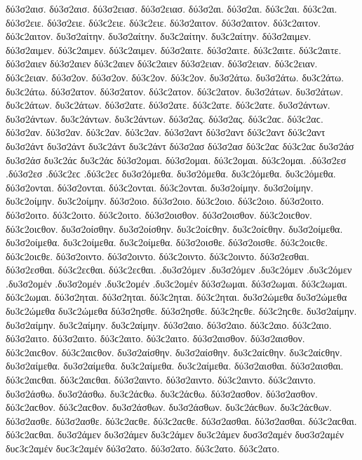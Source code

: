 {δύ3σ2αισ. δύ3σ2αισ. δύ3σ2ειασ. δύ3σ2ειασ. 
δύ3σ2αι. δύ3σ2αι. δύ3ϲ2αι. δύ3ϲ2αι. δύ3σ2ειε. δύ3σ2ειε. δύ3ϲ2ειε. δύ3ϲ2ειε. 
δύ3σ2αιτον. δύ3σ2αιτον. δύ3ϲ2αιτον. δύ3ϲ2αιτον. 
δυ3σ2αίτην. δυ3σ2αίτην. δυ3ϲ2αίτην. δυ3ϲ2αίτην. 
δύ3σ2αιμεν. δύ3σ2αιμεν. δύ3ϲ2αιμεν. δύ3ϲ2αιμεν. 
δύ3σ2αιτε. δύ3σ2αιτε. δύ3ϲ2αιτε. δύ3ϲ2αιτε. 
δύ3σ2αιεν δύ3σ2αιεν δύ3ϲ2αιεν δύ3ϲ2αιεν δύ3σ2ειαν. δύ3σ2ειαν. δύ3ϲ2ειαν. δύ3ϲ2ειαν. 
δύ3σ2ον. δύ3σ2ον. δύ3ϲ2ον. δύ3ϲ2ον. 
δυ3σ2άτω. δυ3σ2άτω. δυ3ϲ2άτω. δυ3ϲ2άτω. 
δύ3σ2ατον. δύ3σ2ατον. δύ3ϲ2ατον. δύ3ϲ2ατον. 
δυ3σ2άτων. δυ3σ2άτων. δυ3ϲ2άτων. δυ3ϲ2άτων. 
δύ3σ2ατε. δύ3σ2ατε. δύ3ϲ2ατε. δύ3ϲ2ατε. 
δυ3σ2άντων. δυ3σ2άντων. δυ3ϲ2άντων. δυ3ϲ2άντων. 
δύ3σ2ας. δύ3σ2ας. δύ3ϲ2αϲ. δύ3ϲ2αϲ. δύ3σ2αν. δύ3σ2αν. δύ3ϲ2αν. δύ3ϲ2αν. δύ3σ2αντ δύ3σ2αντ δύ3ϲ2αντ δύ3ϲ2αντ δυ3σ2άντ δυ3σ2άντ δυ3ϲ2άντ δυ3ϲ2άντ 
δύ3σ2ασ δύ3σ2ασ δύ3ϲ2αϲ δύ3ϲ2αϲ δυ3σ2άσ δυ3σ2άσ δυ3ϲ2άϲ δυ3ϲ2άϲ 
δύ3σ2ομαι. δύ3σ2ομαι. δύ3ϲ2ομαι. δύ3ϲ2ομαι. 
.δύ3σ2εσ .δύ3σ2εσ .δύ3ϲ2εϲ .δύ3ϲ2εϲ 
δυ3σ2όμεθα. δυ3σ2όμεθα. δυ3ϲ2όμεθα. δυ3ϲ2όμεθα. 
δύ3σ2ονται. δύ3σ2ονται. δύ3ϲ2ονται. δύ3ϲ2ονται. 
δυ3σ2οίμην. δυ3σ2οίμην. δυ3ϲ2οίμην. δυ3ϲ2οίμην. 
δύ3σ2οιο. δύ3σ2οιο. δύ3ϲ2οιο. δύ3ϲ2οιο. 
δύ3σ2οιτο. δύ3σ2οιτο. δύ3ϲ2οιτο. δύ3ϲ2οιτο. 
δύ3σ2οισθον. δύ3σ2οισθον. δύ3ϲ2οιϲθον. δύ3ϲ2οιϲθον. 
δυ3σ2οίσθην. δυ3σ2οίσθην. δυ3ϲ2οίϲθην. δυ3ϲ2οίϲθην. 
δυ3σ2οίμεθα. δυ3σ2οίμεθα. δυ3ϲ2οίμεθα. δυ3ϲ2οίμεθα. 
δύ3σ2οισθε. δύ3σ2οισθε. δύ3ϲ2οιϲθε. δύ3ϲ2οιϲθε. 
δύ3σ2οιντο. δύ3σ2οιντο. δύ3ϲ2οιντο. δύ3ϲ2οιντο. 
δύ3σ2εσθαι. δύ3σ2εσθαι. δύ3ϲ2εϲθαι. δύ3ϲ2εϲθαι. 
.δυ3σ2όμεν .δυ3σ2όμεν .δυ3ϲ2όμεν .δυ3ϲ2όμεν   %
.δυ3σ2ομέν .δυ3σ2ομέν .δυ3ϲ2ομέν .δυ3ϲ2ομέν 
δύ3σ2ωμαι. δύ3σ2ωμαι. δύ3ϲ2ωμαι. δύ3ϲ2ωμαι. 
δύ3σ2ηται. δύ3σ2ηται. δύ3ϲ2ηται. δύ3ϲ2ηται. 
δυ3σ2ώμεθα δυ3σ2ώμεθα δυ3ϲ2ώμεθα δυ3ϲ2ώμεθα 
δύ3σ2ησθε. δύ3σ2ησθε. δύ3ϲ2ηϲθε. δύ3ϲ2ηϲθε. 
δυ3σ2αίμην. δυ3σ2αίμην. δυ3ϲ2αίμην. δυ3ϲ2αίμην. 
δύ3σ2αιο. δύ3σ2αιο. δύ3ϲ2αιο. δύ3ϲ2αιο. 
δύ3σ2αιτο. δύ3σ2αιτο. δύ3ϲ2αιτο. δύ3ϲ2αιτο. 
δύ3σ2αισθον. δύ3σ2αισθον. δύ3ϲ2αιϲθον. δύ3ϲ2αιϲθον. 
δυ3σ2αίσθην. δυ3σ2αίσθην. δυ3ϲ2αίϲθην. δυ3ϲ2αίϲθην. 
δυ3σ2αίμεθα. δυ3σ2αίμεθα. δυ3ϲ2αίμεθα. δυ3ϲ2αίμεθα. 
δύ3σ2αισθαι. δύ3σ2αισθαι. δύ3ϲ2αιϲθαι. δύ3ϲ2αιϲθαι. 
δύ3σ2αιντο. δύ3σ2αιντο. δύ3ϲ2αιντο. δύ3ϲ2αιντο. 
δυ3σ2άσθω. δυ3σ2άσθω. δυ3ϲ2άϲθω. δυ3ϲ2άϲθω. 
δύ3σ2ασθον. δύ3σ2ασθον. δύ3ϲ2αϲθον. δύ3ϲ2αϲθον. 
δυ3σ2άσθων. δυ3σ2άσθων. δυ3ϲ2άϲθων. δυ3ϲ2άϲθων. 
δύ3σ2ασθε. δύ3σ2ασθε. δύ3ϲ2αϲθε. δύ3ϲ2αϲθε. 
δύ3σ2ασθαι. δύ3σ2ασθαι. δύ3ϲ2αϲθαι. δύ3ϲ2αϲθαι. 
δυ3σ2άμεν δυ3σ2άμεν δυ3ϲ2άμεν δυ3ϲ2άμεν   %
δυσ3σ2αμέν δυσ3σ2αμέν δυϲ3ϲ2αμέν δυϲ3ϲ2αμέν 
δύ3σ2ατο. δύ3σ2ατο. δύ3ϲ2ατο. δύ3ϲ2ατο.   %
}
